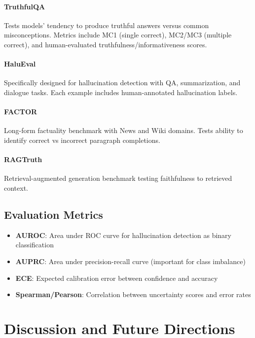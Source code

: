 \documentclass[11pt]{article}
\begin{document}
\paragraph{TruthfulQA} Tests models' tendency to produce truthful answers versus common misconceptions. Metrics include MC1 (single correct), MC2/MC3 (multiple correct), and human-evaluated truthfulness/informativeness scores.

\paragraph{HaluEval} Specifically designed for hallucination detection with QA, summarization, and dialogue tasks. Each example includes human-annotated hallucination labels.

\paragraph{FACTOR} Long-form factuality benchmark with News and Wiki domains. Tests ability to identify correct vs incorrect paragraph completions.

\paragraph{RAGTruth} Retrieval-augmented generation benchmark testing faithfulness to retrieved context.

\subsection{Evaluation Metrics}

\begin{itemize}
    \item \textbf{AUROC}: Area under ROC curve for hallucination detection as binary classification
    \item \textbf{AUPRC}: Area under precision-recall curve (important for class imbalance)
    \item \textbf{ECE}: Expected calibration error between confidence and accuracy
    \item \textbf{Spearman/Pearson}: Correlation between uncertainty scores and error rates
\end{itemize}

\section{Discussion and Future Directions}
\end{document}

